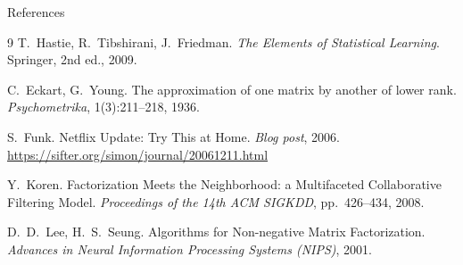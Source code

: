 \documentclass[aspectratio=169,t]{beamer}
\begin{document}
\begin{frame}{References}
  \begin{thebibliography}{9}
      T.~Hastie, R.~Tibshirani, J.~Friedman.
      \textit{The Elements of Statistical Learning}.
      Springer, 2nd ed., 2009.

      C.~Eckart, G.~Young.
      The approximation of one matrix by another of lower rank.
      \textit{Psychometrika}, 1(3):211--218, 1936.

      S.~Funk.
      Netflix Update: Try This at Home.
      \textit{Blog post}, 2006.
      \url{https://sifter.org/simon/journal/20061211.html}

      Y.~Koren.
      Factorization Meets the Neighborhood: a Multifaceted Collaborative Filtering Model.
      \textit{Proceedings of the 14th ACM SIGKDD}, pp.~426--434, 2008.

      D.~D.~Lee, H.~S.~Seung.
      Algorithms for Non-negative Matrix Factorization.
      \textit{Advances in Neural Information Processing Systems (NIPS)}, 2001.
  \end{thebibliography}
\end{frame}
\end{document}
